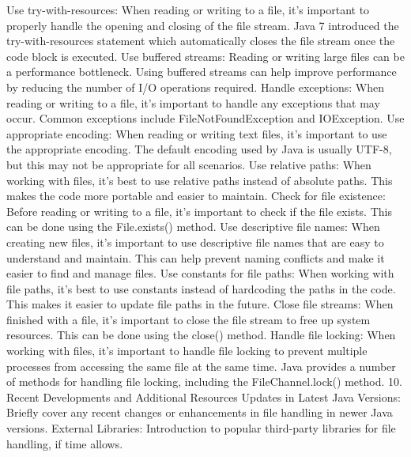 Use try-with-resources: When reading or writing to a file, it’s important to properly handle the opening and closing of the file stream. Java 7 introduced the try-with-resources statement which automatically closes the file stream once the code block is executed.
Use buffered streams: Reading or writing large files can be a performance bottleneck. Using buffered streams can help improve performance by reducing the number of I/O operations required.
Handle exceptions: When reading or writing to a file, it’s important to handle any exceptions that may occur. Common exceptions include FileNotFoundException and IOException.
Use appropriate encoding: When reading or writing text files, it’s important to use the appropriate encoding. The default encoding used by Java is usually UTF-8, but this may not be appropriate for all scenarios.
Use relative paths: When working with files, it’s best to use relative paths instead of absolute paths. This makes the code more portable and easier to maintain.
Check for file existence: Before reading or writing to a file, it’s important to check if the file exists. This can be done using the File.exists() method.
Use descriptive file names: When creating new files, it’s important to use descriptive file names that are easy to understand and maintain. This can help prevent naming conflicts and make it easier to find and manage files.
Use constants for file paths: When working with file paths, it’s best to use constants instead of hardcoding the paths in the code. This makes it easier to update file paths in the future.
Close file streams: When finished with a file, it’s important to close the file stream to free up system resources. This can be done using the close() method.
Handle file locking: When working with files, it’s important to handle file locking to prevent multiple processes from accessing the same file at the same time. Java provides a number of methods for handling file locking, including the FileChannel.lock() method.
10. Recent Developments and Additional Resources
Updates in Latest Java Versions: Briefly cover any recent changes or enhancements in file handling in newer Java versions.
External Libraries: Introduction to popular third-party libraries for file handling, if time allows.

